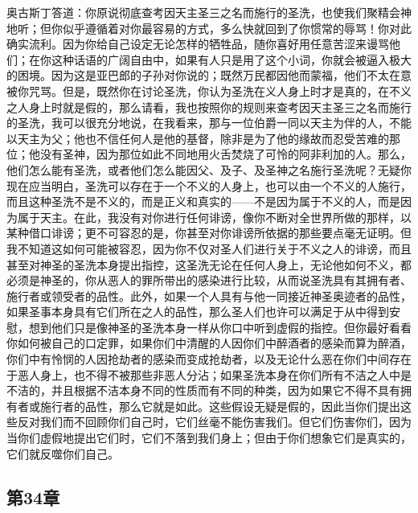 奥古斯丁答道：你原说彻底查考因天主圣三之名而施行的圣洗，也使我们聚精会神地听；但你似乎遵循着对你最容易的方式，多么快就回到了你惯常的辱骂！你对此确实流利。因为你给自己设定无论怎样的牺牲品，随你喜好用任意苦涩来谩骂他们；在你这种话语的广阔自由中，如果有人只是用了这个小词，你就会被逼入极大的困境。因为这是亚巴郎的子孙对你说的；既然万民都因他而蒙福，他们不太在意被你咒骂。但是，既然你在讨论圣洗，你认为圣洗在义人身上时才是真的，在不义之人身上时就是假的，那么请看，我也按照你的规则来查考因天主圣三之名而施行的圣洗，我可以很充分地说，在我看来，那与一位伯爵一同以天主为伴的人，不能以天主为父；他也不信任何人是他的基督，除非是为了他的缘故而忍受苦难的那位；他没有圣神，因为那位如此不同地用火舌焚烧了可怜的阿非利加的人。那么，他们怎么能有圣洗，或者他们怎么能因父、及子、及圣神之名施行圣洗呢？无疑你现在应当明白，圣洗可以存在于一个不义的人身上，也可以由一个不义的人施行，而且这种圣洗不是不义的，而是正义和真实的——不是因为属于不义的人，而是因为属于天主。在此，我没有对你进行任何诽谤，像你不断对全世界所做的那样，以某种借口诽谤；更不可容忍的是，你甚至对你诽谤所依据的那些要点毫无证明。但我不知道这如何可能被容忍，因为你不仅对圣人们进行关于不义之人的诽谤，而且甚至对神圣的圣洗本身提出指控，这圣洗无论在任何人身上，无论他如何不义，都必须是神圣的，你从恶人的罪所带出的感染进行比较，从而说圣洗具有其拥有者、施行者或领受者的品性。此外，如果一个人具有与他一同接近神圣奥迹者的品性，如果圣事本身具有它们所在之人的品性，那么圣人们也许可以满足于从中得到安慰，想到他们只是像神圣的圣洗本身一样从你口中听到虚假的指控。但你最好看看你如何被自己的口定罪，如果你们中清醒的人因你们中醉酒者的感染而算为醉酒，你们中有怜悯的人因抢劫者的感染而变成抢劫者，以及无论什么恶在你们中间存在于恶人身上，也不得不被那些非恶人分沾；如果圣洗本身在你们所有不洁之人中是不洁的，并且根据不洁本身不同的性质而有不同的种类，因为如果它不得不具有拥有者或施行者的品性，那么它就是如此。这些假设无疑是假的，因此当你们提出这些反对我们而不回顾你们自己时，它们丝毫不能伤害我们。但它们伤害你们，因为当你们虚假地提出它们时，它们不落到我们身上；但由于你们想象它们是真实的，它们就反噬你们自己。\par


\subsection{第34章}

\par

